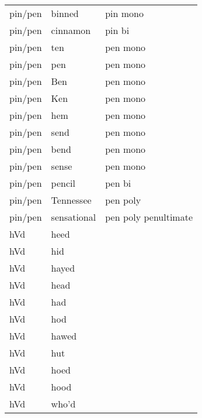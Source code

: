\begin{longtable}{lll}
pin/pen          & binned      & pin mono             \\
pin/pen          & cinnamon    & pin bi               \\
pin/pen          & ten         & pen mono             \\
pin/pen          & pen         & pen mono             \\
pin/pen          & Ben         & pen mono             \\
pin/pen          & Ken         & pen mono             \\
pin/pen          & hem         & pen mono             \\
pin/pen          & send        & pen mono             \\
pin/pen          & bend        & pen mono             \\
pin/pen          & sense       & pen mono             \\
pin/pen          & pencil      & pen bi               \\
pin/pen          & Tennessee   & pen poly             \\
pin/pen          & sensational & pen poly penultimate \\
hVd              & heed        &                      \\
hVd              & hid         &                      \\
hVd              & hayed       &                      \\
hVd              & head        &                      \\
hVd              & had         &                      \\
hVd              & hod         &                      \\
hVd              & hawed       &                      \\
hVd              & hut         &                      \\
hVd              & hoed        &                      \\
hVd              & hood        &                      \\
hVd              & who’d       &                     
\end{longtable}